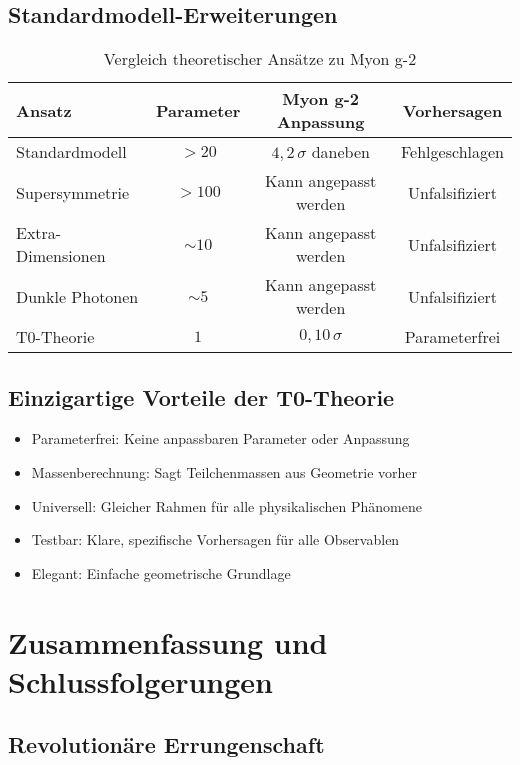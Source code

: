 \documentclass[12pt,a4paper]{article}
\numberwithin{equation}{section}
\begin{document}
	\subsection{Standardmodell-Erweiterungen}
	
	\begin{table}[h]
		\centering
		\begin{tabular}{@{}lccc@{}}
			\toprule
			\textbf{Ansatz} & \textbf{Parameter} & \textbf{Myon g-2 Anpassung} & \textbf{Vorhersagen} \\
			\midrule
			Standardmodell & $>20$ & $4{,}2\,\sigma$ daneben & Fehlgeschlagen \\
			Supersymmetrie & $>100$ & Kann angepasst werden & Unfalsifiziert \\
			Extra-Dimensionen & $\sim 10$ & Kann angepasst werden & Unfalsifiziert \\
			Dunkle Photonen & $\sim 5$ & Kann angepasst werden & Unfalsifiziert \\
			T0-Theorie & $1$ & $0{,}10\,\sigma$ & Parameterfrei \\
			\bottomrule
		\end{tabular}
		\caption{Vergleich theoretischer Ans\"atze zu Myon g-2}
	\end{table}
	
	\subsection{Einzigartige Vorteile der T0-Theorie}
	
	\begin{itemize}
		\item Parameterfrei: Keine anpassbaren Parameter oder Anpassung
		\item Massenberechnung: Sagt Teilchenmassen aus Geometrie vorher
		\item Universell: Gleicher Rahmen f\"ur alle physikalischen Ph\"anomene
		\item Testbar: Klare, spezifische Vorhersagen f\"ur alle Observablen
		\item Elegant: Einfache geometrische Grundlage
	\end{itemize}
	
	\section{Zusammenfassung und Schlussfolgerungen}
	
	\subsection{Revolution\"are Errungenschaft}
	
\end{document}
